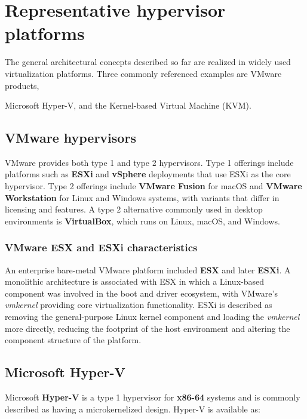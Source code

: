\section{Representative hypervisor platforms}

The general architectural concepts described so far are realized in widely used virtualization platforms. Three commonly referenced examples are VMware products,

Microsoft Hyper-V, and the Kernel-based Virtual Machine (KVM).

\subsection{VMware hypervisors}

VMware provides both type 1 and type 2 hypervisors. Type 1 offerings include platforms such as \textbf{ESXi} and \textbf{vSphere} deployments that use ESXi as the core hypervisor. Type 2 offerings include \textbf{VMware Fusion} for macOS and \textbf{VMware Workstation} for Linux and Windows systems, with variants that differ in licensing and features. A type 2 alternative commonly used in desktop environments is \textbf{VirtualBox}, which runs on Linux, macOS, and Windows.

\subsubsection*{VMware ESX and ESXi characteristics}

An enterprise bare-metal VMware platform included \textbf{ESX} and later \textbf{ESXi}. A monolithic architecture is associated with ESX in which a Linux-based component was involved in the boot and driver ecosystem, with VMware's \emph{vmkernel} providing core virtualization functionality. ESXi is described as removing the general-purpose Linux kernel component and loading the \emph{vmkernel} more directly, reducing the footprint of the host environment and altering the component structure of the platform.

\subsection{Microsoft Hyper-V}

Microsoft \textbf{Hyper-V} is a type 1 hypervisor for \textbf{x86-64} systems and is commonly described as having a microkernelized design. Hyper-V is available as:

